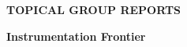 

  \vfill

\begin{center}
\begin{Huge}   {\bf  TOPICAL GROUP REPORTS}

\bigskip

\bigskip

 {\bf Instrumentation  Frontier }

\vfill

\vfill

\end{Huge}
\end{center}

\newpage
\thispagestyle{empty}
\mbox{\null}


